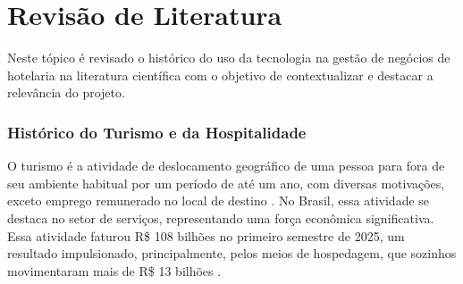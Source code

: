 \documentclass[
	12pt,				%
	openany,			%
	oneside,			%
	a4paper,			%
	english,			%
	french,				%
	spanish,			%
	brazil				%
	]{abntex2}
\begin{document}


%
\chapter{Revisão de Literatura}
Neste tópico é revisado o histórico do uso da tecnologia na gestão de negócios de hotelaria na literatura científica com o objetivo de contextualizar e destacar a relevância do projeto.
\subsection{Histórico do Turismo e da Hospitalidade} 
O turismo é a atividade de deslocamento geográfico de uma pessoa para fora de seu ambiente habitual por um período de até um ano, com diversas motivações, exceto emprego remunerado no local de destino \cite{un2008international}. No Brasil, essa atividade se destaca no setor de serviços, representando uma força econômica significativa. Essa atividade faturou R\$ 108 bilhões no primeiro semestre de 2025, um resultado impulsionado, principalmente, pelos meios de hospedagem, que sozinhos movimentaram mais de R\$ 13 bilhões \cite{fecomercio2025}.
\end{document}
